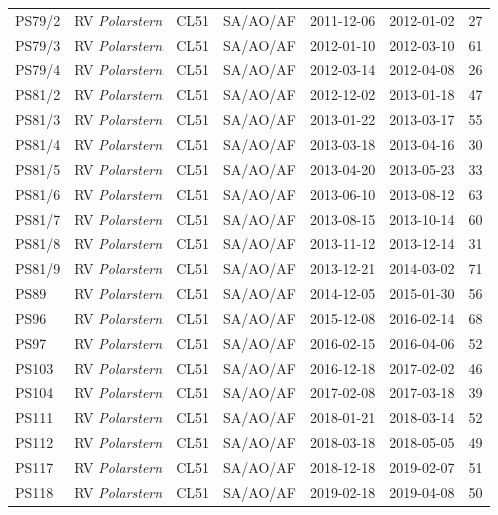 \documentclass[draft]{agujournal2019}
\begin{document}
\begin{table}[p!]
\begin{tabular}{llllllr}
PS79/2   & RV \emph{Polarstern}          & CL51    & SA/AO/AF & 2011-12-06 & 2012-01-02 & 27 \\
PS79/3   & RV \emph{Polarstern}          & CL51    & SA/AO/AF & 2012-01-10 & 2012-03-10 & 61 \\
PS79/4   & RV \emph{Polarstern}          & CL51    & SA/AO/AF & 2012-03-14 & 2012-04-08 & 26 \\
PS81/2   & RV \emph{Polarstern}          & CL51    & SA/AO/AF & 2012-12-02 & 2013-01-18 & 47 \\
PS81/3   & RV \emph{Polarstern}          & CL51    & SA/AO/AF & 2013-01-22 & 2013-03-17 & 55 \\
PS81/4   & RV \emph{Polarstern}          & CL51    & SA/AO/AF & 2013-03-18 & 2013-04-16 & 30 \\
PS81/5   & RV \emph{Polarstern}          & CL51    & SA/AO/AF & 2013-04-20 & 2013-05-23 & 33 \\
PS81/6   & RV \emph{Polarstern}          & CL51    & SA/AO/AF & 2013-06-10 & 2013-08-12 & 63 \\
PS81/7   & RV \emph{Polarstern}          & CL51    & SA/AO/AF & 2013-08-15 & 2013-10-14 & 60 \\
PS81/8   & RV \emph{Polarstern}          & CL51    & SA/AO/AF & 2013-11-12 & 2013-12-14 & 31 \\
PS81/9   & RV \emph{Polarstern}          & CL51    & SA/AO/AF & 2013-12-21 & 2014-03-02 & 71 \\
PS89     & RV \emph{Polarstern}          & CL51    & SA/AO/AF & 2014-12-05 & 2015-01-30 & 56 \\
PS96     & RV \emph{Polarstern}          & CL51    & SA/AO/AF & 2015-12-08 & 2016-02-14 & 68 \\
PS97     & RV \emph{Polarstern}          & CL51    & SA/AO/AF & 2016-02-15 & 2016-04-06 & 52 \\
PS103    & RV \emph{Polarstern}          & CL51    & SA/AO/AF & 2016-12-18 & 2017-02-02 & 46 \\
PS104    & RV \emph{Polarstern}          & CL51    & SA/AO/AF & 2017-02-08 & 2017-03-18 & 39 \\
PS111    & RV \emph{Polarstern}          & CL51    & SA/AO/AF & 2018-01-21 & 2018-03-14 & 52 \\
PS112    & RV \emph{Polarstern}          & CL51    & SA/AO/AF & 2018-03-18 & 2018-05-05 & 49 \\
PS117    & RV \emph{Polarstern}          & CL51    & SA/AO/AF & 2018-12-18 & 2019-02-07 & 51 \\
PS118    & RV \emph{Polarstern}          & CL51    & SA/AO/AF & 2019-02-18 & 2019-04-08 & 50 \\

\end{tabular}
\end{table}
\end{document}
